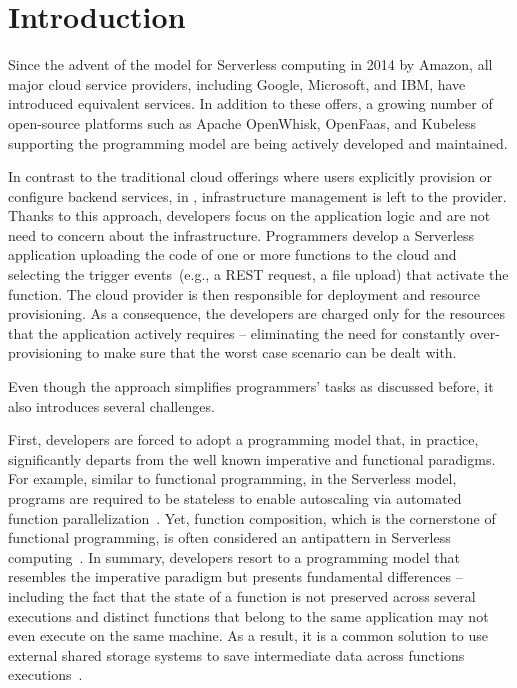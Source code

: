 
\section{Introduction}

Since the advent of the \faas model for Serverless computing in 2014  
by Amazon,
all major cloud service providers, including 
Google,
Microsoft,
and IBM,
have introduced equivalent services. 
%
In addition to these offers, a growing number of open-source platforms 
such as Apache OpenWhisk,
OpenFaas,
and Kubeless
supporting the \faas programming model are being actively developed and maintained.

In contrast to the traditional cloud offerings where users explicitly provision or configure 
backend services, in \faas, infrastructure management is left to the provider.
Thanks to this approach, developers focus on the application logic and 
are not need to concern about the infrastructure. 
Programmers develop a Serverless application uploading the code of one or more 
functions to the cloud and selecting the trigger events~(e.g., a REST request, 
a file upload) that activate the function. The cloud provider is then responsible for 
deployment and resource provisioning. As a consequence, the developers are  
charged only for the resources that the application actively requires -- eliminating the 
need for constantly over-provisioning to make sure that the worst case scenario
can be dealt with.

Even though the \faas approach simplifies programmers' tasks 
as discussed before, it also introduces several challenges.

First, developers are forced to adopt a programming model that, in practice,
significantly departs from the well known imperative and functional paradigms.
For example, similar to functional programming, in the Serverless model, 
programs are required to be stateless
to enable autoscaling via automated function parallelization~\cite{hellerstein2018serverless}.
Yet, function composition, which is the cornerstone of functional programming,
is often considered an antipattern in Serverless computing~\cite{baldini2017serverless}.
%
In summary, developers resort to a programming model that 
resembles the imperative paradigm but presents fundamental 
differences -- including the fact that the state of a function is not 
preserved across several executions and
distinct functions that belong to the same application may not even execute 
on the same machine. As a result, it is a common solution 
to use external shared storage systems 
to save intermediate data across functions 
executions~\cite{klimovic2018understanding}.


